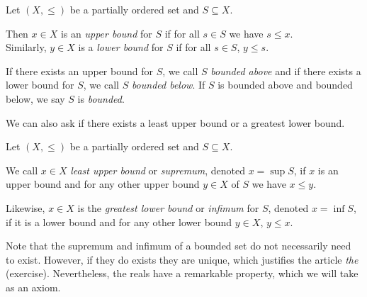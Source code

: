 \documentclass [aspectratio=169, handout]{beamer}
\begin{document}
\begin{frame}
\begin{definition}%
Let $(X,\leq)$ be a partially ordered set and $S\subseteq X$. 

 \vspace{1em}

Then $x\in X$ is an \emph{upper bound} for $S$ if for all $s \in S$ we have $s\leq x$.\\
 Similarly, $y\in X$ is a \emph{lower bound} for $S$ if for all $s\in S$, $y\leq s$. 
 
 \vspace{1em}
 
 If there exists an upper bound for $S$, we call $S$ \emph{bounded above} and if there exists a lower bound for $S$, we call $S$ \emph{bounded below}. If $S$ is bounded above and bounded below, we say $S$ is \emph{bounded}. 
\end{definition}

\end{frame}

\begin{frame}

We can also ask if there exists a least upper bound or a greatest lower bound. 

\begin{definition}%
Let $(X,\leq)$ be a partially ordered set and $S\subseteq X$. 

\vspace{1em}

We call $x\in X$ \emph{least upper bound} or \emph{supremum}, denoted $x= \sup S$, if $x$ is an upper bound and for any other upper bound $y\in X$ of $S$ we have $x\leq y$. 

\vspace{1em}

Likewise, $x\in X$ is the \emph{greatest lower bound} or \emph{infimum} for $S$, denoted $x= \inf S$, if it is a lower bound and for any other lower bound $y\in X$, $y\leq x$.
\end{definition}

\vspace{1em}
Note that the supremum and infimum of a bounded set do not necessarily need to exist. However, if they do exists they are unique, which justifies the article \emph{the} (exercise). Nevertheless, the reals have a remarkable property, which we will take as an axiom.

\end{frame}
\end{document}
